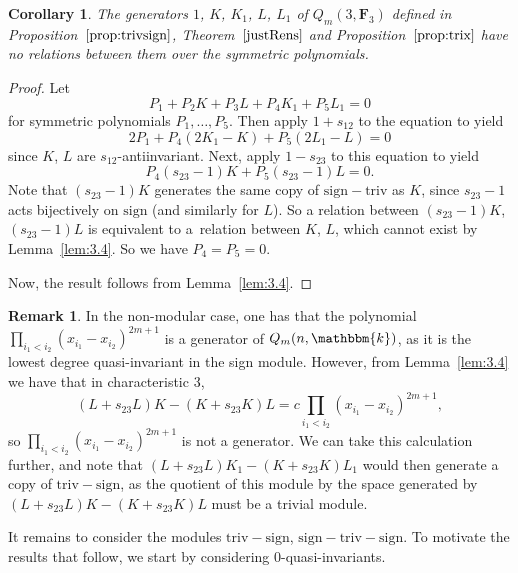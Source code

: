 \documentclass[pdftex]{sigma}
\newtheorem{Corollary}[Theorem]{Corollary}
\theoremstyle{definition}
\newtheorem{Remark}[Theorem]{Remark}
\numberwithin{equation}{section}
\renewcommand{\k}{\mathbbm{k}}
\newcommand{\sign}{\mathrm{sign}}
\newcommand{\six}{\mathrm{sign-triv-sign}}
\newcommand{\siv}{\mathrm{sign-triv}}
\newcommand{\tign}{\mathrm{triv-sign}}
\begin{document}
 \begin{Corollary}\label{cor:5gens}
 The generators $1$, $K$, $K_1$, $L$, $L_1$ of $Q_m(3,\mathbf{F}_3)$ defined in Proposition~$\ref{prop:trivsign}$, Theorem~$\ref{justRens}$ and Proposition~$\ref{prop:trix}$ have no relations between them over the symmetric polynomials.
 \end{Corollary}

 \begin{proof}
 Let
 \[P_1+P_2K+P_3L+P_4K_1+P_5L_1=0\]
 for symmetric polynomials $P_1,\dots,P_5$. Then apply $1+s_{12}$ to the equation to yield
 \[2P_1+P_4(2K_1-K)+P_5(2L_1-L)=0\]
 since $K$, $L$ are $s_{12}$-antiinvariant. Next, apply $1-s_{23}$ to this equation to yield
 \[P_4(s_{23}-1)K+P_5(s_{23}-1)L=0.\]
 Note that $(s_{23}-1)K$ generates the same copy of $\siv$ as $K$, since $s_{23}-1$ acts bijectively on $\sign$ (and similarly for $L$). So a relation between $(s_{23}-1)K$, $(s_{23}-1)L$ is equivalent to a~relation between $K$, $L$, which cannot exist by Lemma~\ref{lem:3.4}. So we have $P_4=P_5=0$.

 Now, the result follows from Lemma~\ref{lem:3.4}.
 \end{proof}

 \begin{Remark}\label{rem:sign}
 In the non-modular case, one has that the polynomial $\prod_{i_1<i_2}(x_{i_1}-x_{i_2})^{2m+1}$ is a generator of $Q_m(n,\k)$, as it is the lowest degree quasi-invariant in the sign module. However, from Lemma~\ref{lem:3.4} we have that in characteristic 3,
 \[(L+s_{23}L)K-(K+s_{23}K)L=c\prod_{i_1<i_2}(x_{i_1}-x_{i_2})^{2m+1},\]
 so $\prod_{i_1<i_2}(x_{i_1}-x_{i_2})^{2m+1}$ is not a generator. We can take this calculation further, and note that $(L+s_{23}L)K_1-(K+s_{23}K)L_1$ would then generate a copy of $\tign$, as the quotient of this module by the space generated by $(L+s_{23}L)K-(K+s_{23}K)L$ must be a trivial module.
 \end{Remark}

 It remains to consider the modules $\tign$, $\six$. To motivate the results that follow, we start by considering 0-quasi-invariants.
\end{document}
